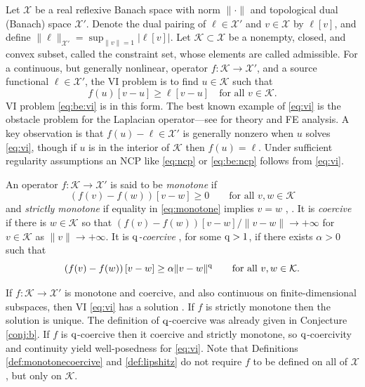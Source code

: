\documentclass[hidelinks,onefignum,onetabnum,final]{siamart220329}  %
\newcommand{\cK}{\mathcal{K}}
\newcommand{\cX}{\mathcal{X}}
\newcommand{\qq}{{\text{\textnormal{q}}}}
\begin{document}
Let $\cX$ be a real reflexive Banach space with norm $\|\cdot\|$ and topological dual (Banach) space $\cX'$.  Denote the dual pairing of $\ell \in \cX'$ and $v\in\cX$ by $\ell[v]$, and define $\|\ell\|_{\cX'} = \sup_{\|v\|=1} \big|\ell[v]\big|$.  Let $\cK \subset \cX$ be a nonempty, closed, and convex subset, called the constraint set, whose elements are called admissible.  For a continuous, but generally nonlinear, operator $f:\cK \to \cX'$, and a source functional $\ell\in \cX'$, the VI problem is to find $u\in \cK$ such that
\begin{equation}
f(u)[v-u] \ge \ell[v-u] \quad \text{for all } v\in \cK. \label{eq:vi}
\end{equation}
VI problem \eqref{eq:be:vi} is in this form.  The best known example of \eqref{eq:vi} is the obstacle problem for the Laplacian operator---see \cite{Ciarlet2002,Evans2010,KinderlehrerStampacchia1980} for theory and FE analysis.  A key observation is that $f(u)-\ell \in \cX'$ is generally nonzero when $u$ solves \eqref{eq:vi}, though if $u$ is in the interior of $\cK$ then $f(u)=\ell$.  Under sufficient regularity assumptions an NCP like \eqref{eq:ncp} or \eqref{eq:be:ncp} follows from \eqref{eq:vi}.

\begin{definition} \label{def:monotonecoercive}
An operator $f:\cK \to \cX'$ is said to be \emph{monotone} if
\begin{equation}
\left(f(v)-f(w)\right)[v-w] \ge 0 \qquad \text{for all } v,w \in \cK \label{eq:monotone}
\end{equation}
and \emph{strictly monotone} if equality in \eqref{eq:monotone} implies $v=w$ \cite{Minty1963}, \cite[Chapter III]{KinderlehrerStampacchia1980}.  It is \emph{coercive} if there is $w\in \cK$ so that $\left(f(v)-f(w)\right)[v-w]/\|v-w\| \to +\infty$ for $v \in \cK$ as $\|v\| \to +\infty$.  It is \emph{$\qq$-coercive} \cite{Bueler2021conservation}, for some $\qq>1$, if there exists $\alpha>0$ such that
\begin{equation}
\left(f(v)-f(w)\right)[v-w] \ge \alpha \|v-w\|^\qq \qquad \text{for all } v,w \in \cK. \label{eq:qcoercive}
\end{equation}
\end{definition}

If $f:\cK \to \cX'$ is monotone and coercive, and also continuous on finite-dimensional subspaces, then VI \eqref{eq:vi} has a solution \cite[Corollary III.1.8]{KinderlehrerStampacchia1980}.  If $f$ is strictly monotone then the solution is unique.  The definition of $\qq$-coercive was already given in Conjecture \ref{conj:b}.  If $f$ is $\qq$-coercive then it coercive and strictly monotone, so $\qq$-coercivity and continuity yield well-posedness for \eqref{eq:vi}.  Note that Definitions \ref{def:monotonecoercive} and \ref{def:lipshitz} do not require $f$ to be defined on all of $\cX$, but only on $\cK$.
  
\end{document}
